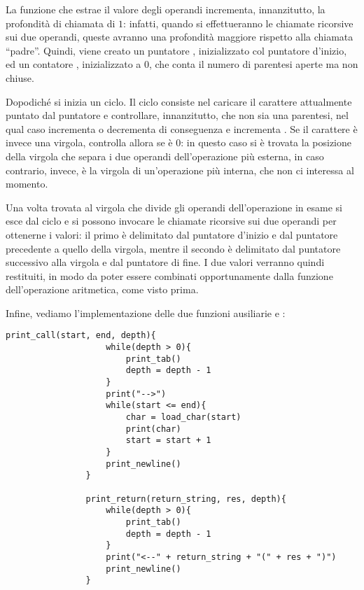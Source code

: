         La funzione che estrae il valore degli operandi incrementa, innanzitutto, la profondità di chiamata di $1$: infatti, quando si effettueranno le chiamate ricorsive sui due operandi, queste avranno una profondità maggiore rispetto alla chiamata ``padre''. Quindi, viene creato un puntatore , inizializzato col puntatore d'inizio, ed un contatore , inizializzato a $0$, che conta il numero di parentesi aperte ma non chiuse.
        
        Dopodiché si inizia un ciclo. Il ciclo consiste nel caricare il carattere attualmente puntato dal puntatore  e controllare, innanzitutto, che non sia una parentesi, nel qual caso incrementa o decrementa  di conseguenza e incrementa . Se il carattere è invece una virgola, controlla allora se  è $0$: in questo caso si è trovata la posizione della virgola che separa i due operandi dell'operazione più esterna, in caso contrario, invece, è la virgola di un'operazione più interna, che non ci interessa al momento.
        
        Una volta trovata al virgola che divide gli operandi dell'operazione in esame si esce dal ciclo e si possono invocare le chiamate ricorsive sui due operandi per ottenerne i valori: il primo è delimitato dal puntatore d'inizio e dal puntatore precedente a quello della virgola, mentre il secondo è delimitato dal puntatore successivo alla virgola e dal puntatore di fine. I due valori verranno quindi restituiti, in modo da poter essere combinati opportunamente dalla funzione dell'operazione aritmetica, come visto prima.
        
        Infine, vediamo l'implementazione delle due funzioni ausiliarie  e :
		
        \begin{center}
           	\begin{lstlisting}[language=pseudo, gobble=14]
                print_call(start, end, depth){
                    while(depth > 0){
                        print_tab()
                        depth = depth - 1
                    }
                    print("-->")
                    while(start <= end){
                        char = load_char(start)
                        print(char)
                        start = start + 1
                    }
                    print_newline()
                }
                
                print_return(return_string, res, depth){
                    while(depth > 0){
                        print_tab()
                        depth = depth - 1
                    }
                    print("<--" + return_string + "(" + res + ")")
                    print_newline()
                }\end{lstlisting}
        \end{center}
		
